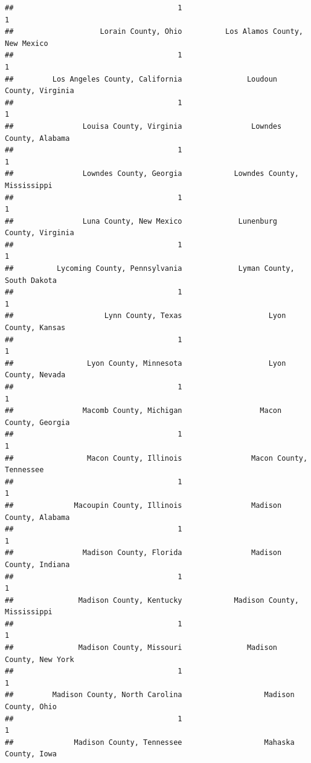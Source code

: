 \documentclass[
]{article}
\begin{document}
\begin{verbatim}
##                                      1                                      1 
##                    Lorain County, Ohio          Los Alamos County, New Mexico 
##                                      1                                      1 
##         Los Angeles County, California               Loudoun County, Virginia 
##                                      1                                      1 
##                Louisa County, Virginia                Lowndes County, Alabama 
##                                      1                                      1 
##                Lowndes County, Georgia            Lowndes County, Mississippi 
##                                      1                                      1 
##                Luna County, New Mexico             Lunenburg County, Virginia 
##                                      1                                      1 
##          Lycoming County, Pennsylvania             Lyman County, South Dakota 
##                                      1                                      1 
##                     Lynn County, Texas                    Lyon County, Kansas 
##                                      1                                      1 
##                 Lyon County, Minnesota                    Lyon County, Nevada 
##                                      1                                      1 
##                Macomb County, Michigan                  Macon County, Georgia 
##                                      1                                      1 
##                 Macon County, Illinois                Macon County, Tennessee 
##                                      1                                      1 
##              Macoupin County, Illinois                Madison County, Alabama 
##                                      1                                      1 
##                Madison County, Florida                Madison County, Indiana 
##                                      1                                      1 
##               Madison County, Kentucky            Madison County, Mississippi 
##                                      1                                      1 
##               Madison County, Missouri               Madison County, New York 
##                                      1                                      1 
##         Madison County, North Carolina                   Madison County, Ohio 
##                                      1                                      1 
##              Madison County, Tennessee                   Mahaska County, Iowa 

\end{verbatim}
\end{document}
